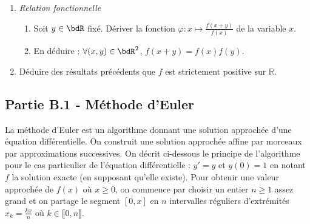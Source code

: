 \documentclass[a4paper,french,bookmarks]{article}
\begin{document}
\begin{enumerate}
    \item \textit{Relation fonctionnelle}
    \begin{enumerate}
        \item Soit $y \in \bdR$ fixé. Dériver la fonction $\varphi : x \mapsto \frac{f(x+y)}{f(x)}$     de la variable $x$.
        
        \item En déduire : $\forall (x,y) \in \bdR^2$, $f(x+y)=f(x)f(y)$.
    \end{enumerate}
    
    \item Déduire des résultats précédents que $f$ est strictement positive sur $\mathbb{R}$.
    
\end{enumerate}

\subsection*{Partie B.1 - Méthode d'Euler}

La méthode d'Euler est un algorithme donnant une solution approchée d'une équation différentielle. On construit une solution approchée affine par morceaux par approximations successives. On décrit ci-dessous le principe de l'algorithme pour le cas particulier de l'équation différentielle : $y ' = y$ et $y(0)=1$ en notant $f$ la solution exacte (en supposant qu'elle existe). Pour obtenir une valeur approchée de $f(x)$ où $x \geq 0$, on commence par choisir un entier $n \geq 1$ assez grand et on partage le segment $\left[0,x\right]$ en $n$ intervalles réguliers d'extrémités $x_k = \frac{kx}{n}$ où $k \in \llbracket0,n\rrbracket$.\vspace{2mm}
\end{document}
